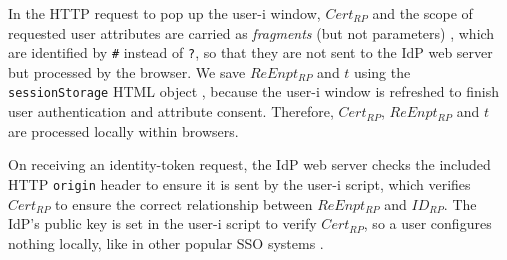 In the HTTP request to pop up the user-i window, $Cert_{RP}$ and the scope of requested user attributes are carried as \emph{fragments} (but not parameters) \cite{url-fragment}, which are identified by \texttt{\#} instead of \texttt{?},
    so that they are not sent to the IdP web server but processed by the browser.
We save $ReEnpt_{RP}$ and $t$ using the \verb+sessionStorage+ HTML object \cite{sessionStorageHtml},
    because the user-i window is refreshed to finish user authentication and attribute consent.
Therefore, $Cert_{RP}$, $ReEnpt_{RP}$ and $t$ are processed locally within browsers.


On receiving an identity-token request, the IdP web server checks the included HTTP \texttt{origin} header to ensure it is sent by the user-i script,
which verifies $Cert_{RP}$ to ensure the correct relationship between $ReEnpt_{RP}$ and $ID_{RP}$.
The IdP's public key is set in the user-i script to verify $Cert_{RP}$,
so a user configures nothing locally,
 like in other popular SSO systems \cite{OpenIDConnect, rfc6749, SAML, SAMLIdentifier}.



